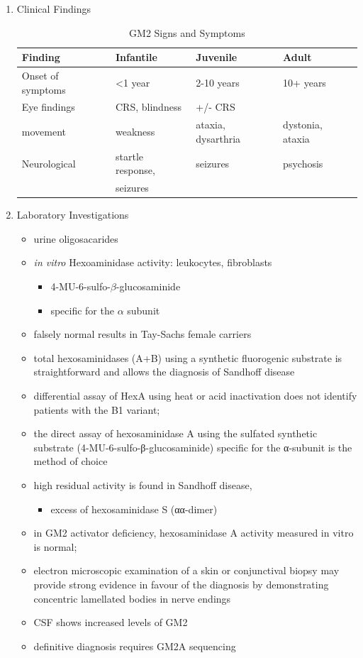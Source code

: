 \documentclass{scrartcl}
\begin{document}
\begin{enumerate}
\item Clinical Findings
\label{sec:orga580034}
\begin{table}[htbp]
\caption{\label{tab:org11a22aa}
GM2 Signs and Symptoms}
\centering
\begin{tabular}{llll}
Finding & Infantile & Juvenile & Adult\\
\hline
Onset of symptoms & <1 year & 2-10 years & 10+ years\\
Eye findings & CRS, blindness & +/- CRS & \\
movement & weakness & ataxia, dysarthria & dystonia, ataxia\\
Neurological & startle response, & seizures & psychosis\\
 & seizures &  & \\
\end{tabular}
\end{table}

\item Laboratory Investigations
\label{sec:orgef8938c}
\begin{itemize}
\item urine oligosacarides
\item \emph{in vitro} Hexoaminidase activity: leukocytes, fibroblasts
\begin{itemize}
\item 4-MU-6-sulfo-\(\beta\)-glucosaminide
\item specific for the \(\alpha\) subunit
\end{itemize}
\item falsely normal results in Tay-Sachs female carriers
\item total hexosaminidases (A+B) using a synthetic fluorogenic substrate
is straightforward and allows the diagnosis of Sandhoff disease
\item differential assay of HexA using heat or acid
inactivation does not identify patients with the B1 variant;
\item the direct assay of hexosaminidase A using the sulfated synthetic
substrate (4-MU-6-sulfo-β-glucosaminide) specific for the α-subunit
is the method of choice
\item high residual activity is found in Sandhoff disease,
\begin{itemize}
\item excess of hexosaminidase S (αα-dimer)
\end{itemize}
\item in GM2 activator deficiency, hexosaminidase A activity measured in
vitro is normal;
\item electron microscopic examination of a skin or conjunctival biopsy
may provide strong evidence in favour of the diagnosis by
demonstrating concentric lamellated bodies in nerve endings
\item CSF shows increased levels of GM2
\item definitive diagnosis requires GM2A sequencing
\end{itemize}


\end{enumerate}
\end{document}
